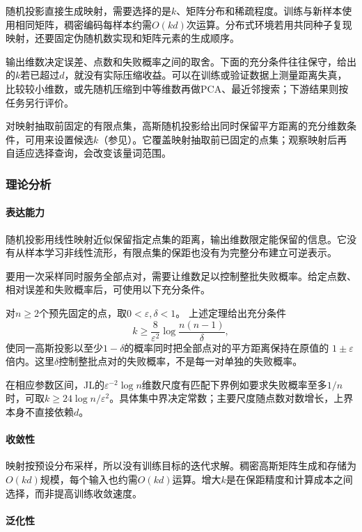 随机投影直接生成映射，需要选择的是$k$、矩阵分布和稀疏程度。训练与新样本使用相同矩阵，稠密编码每样本约需$O(kd)$次运算。分布式环境若用共同种子复现映射，还要固定伪随机数实现和矩阵元素的生成顺序。

输出维数决定误差、点数和失败概率之间的取舍。下面的充分条件往往保守，给出的$k$若已超过$d$，就没有实际压缩收益。可以在训练或验证数据上测量距离失真，比较较小维数，或先随机压缩到中等维数再做PCA、最近邻搜索；下游结果则按任务另行评价。

对映射抽取前固定的有限点集，高斯随机投影给出同时保留平方距离的充分维数条件，可用来设置候选$k$（参见）。它覆盖映射抽取前已固定的点集；观察映射后再自适应选择查询，会改变该量词范围。

\subsubsection{理论分析}
\label{sec:dim-rp-theory}

\paragraph{表达能力}
随机投影用线性映射近似保留指定点集的距离，输出维数限定能保留的信息。它没有从样本学习非线性流形，有限点集的保距也没有为完整分布建立可逆表示。

要用一次采样同时服务全部点对，需要让维数足以控制整批失败概率。给定点数、相对误差和失败概率后，可使用以下充分条件。

对$n\geq2$个预先固定的点，取$0<\varepsilon,\delta<1$。
上述定理给出充分条件
\[
  k\geq\frac{8}{\varepsilon^2}\log\frac{n(n-1)}{\delta},
\]
使同一高斯投影以至少$1-\delta$的概率同时把全部点对的平方距离保持在原值的
$1\pm\varepsilon$倍内。这里$\delta$控制整批点对的失败概率，不是每一对单独的失败概率。

在相应参数区间，JL的$\varepsilon^{-2}\log n$维数尺度有匹配下界例如要求失败概率至多$1/n$时，可取$k\geq24\log n/\varepsilon^2$。具体集中界决定常数；主要尺度随点数对数增长，上界本身不直接依赖$d$。

\paragraph{收敛性}
映射按预设分布采样，所以没有训练目标的迭代求解。稠密高斯矩阵生成和存储为$O(kd)$规模，每个输入也约需$O(kd)$运算。增大$k$是在保距精度和计算成本之间选择，而非提高训练收敛速度。

\paragraph{泛化性}

